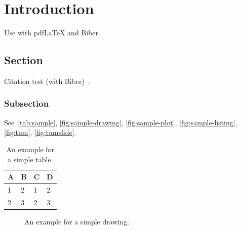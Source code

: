 
\chapter{Introduction}\label{chapter:introduction}
Use with pdfLaTeX and Biber.

\section{Section}
Citation test (with Biber)~\parencite{latex}.

\subsection{Subsection}

See~\autoref{tab:sample}, \autoref{fig:sample-drawing}, \autoref{fig:sample-plot}, \autoref{fig:sample-listing}, \autoref{fig:tum}, \autoref{fig:tumslide}.

\begin{table}[htpb]
  \caption[Example table]{An example for a simple table.}\label{tab:sample}
  \centering
  \begin{tabular}{l l l l}
    \toprule
      A & B & C & D \\
    \midrule
      1 & 2 & 1 & 2 \\
      2 & 3 & 2 & 3 \\
    \bottomrule
  \end{tabular}
\end{table}

\begin{figure}[htpb]
  \centering
  \caption[Example drawing]{An example for a simple drawing.}\label{fig:sample-drawing}
\end{figure}

